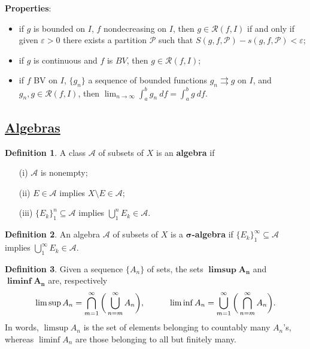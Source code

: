\documentclass[11pt]{amsart}
\theoremstyle{definition}
\newtheorem*{definition*}{Definition}
\renewcommand\:{\colon}
\newcommand{\calA}{\mathcal{A}}
\newcommand{\calP}{\mathcal{P}}
\newcommand{\calR}{\mathcal{R}}
\begin{document}
\noindent \textbf{Properties}:
\begin{itemize}[leftmargin=15pt]\setlength\itemsep{0em}
	\item if $g$ is bounded on $I$, $f$ nondecreasing on $I$, then $g \in \calR(f, I)$ if and only if given $\varepsilon > 0$ there exists a partition $\calP$ such that $S(g, f, \calP) - s(g, f, \calP) < \varepsilon$;
	\item if $g$ is continuous and $f$ is $BV$, then $g \in \calR(f, I)$;
	\item if $f$ BV on $I$, $\{g_n\}$ a sequence of bounded functions $g_n \rightrightarrows g$ on $I$, and $g_n, g \in \calR(f, I)$, then $\lim_{n\to\infty} \int_a^b g_n \ df = \int_a^b g \ df$.
\end{itemize}
\vskip30pt



\subsection*{\underline{Algebras}}

\begin{definition*}
	A class $\calA$ of subsets of $X$ is an \textbf{algebra} if 
	\begin{itemize}[leftmargin=22.5pt]\setlength\itemsep{0em}
		\item[\textnormal{(i)}] $\calA$ is nonempty;
		\item[\textnormal{(ii)}] $E \in \calA$ implies $X \setminus E \in \calA$;
		\item[\textnormal{(iii)}] $\{E_k\}_1^n \subseteq \calA$ implies $\bigcup_1^n E_k \in \calA$.
	\end{itemize}
\end{definition*}

\begin{definition*}
	An algebra $\calA$ of subsets of $X$ is a \textbf{$\boldsymbol{\sigma}$-algebra} if $\{E_k\}_1^\infty \subseteq \calA$ implies $\bigcup_1^\infty E_k \in \calA$. 
\end{definition*}

\begin{definition*}
	Given a sequence $\{A_n\}$ of sets, the sets $\boldsymbol{\limsup A_n}$ and $\boldsymbol{\liminf A_n}$ are, respectively
		\[ \limsup A_n = \bigcap_{m=1}^\infty \bigg( \bigcup_{n=m}^\infty A_n \bigg), \hskip30pt \liminf A_n = \bigcup_{m=1}^\infty \bigg( \bigcap_{n=m}^\infty A_n \bigg). \]
	In words, $\limsup A_n$ is the set of elements belonging to countably many $A_n$'s, whereas $\liminf A_n$ are those belonging to all but finitely many.
\end{definition*}
\end{document}
